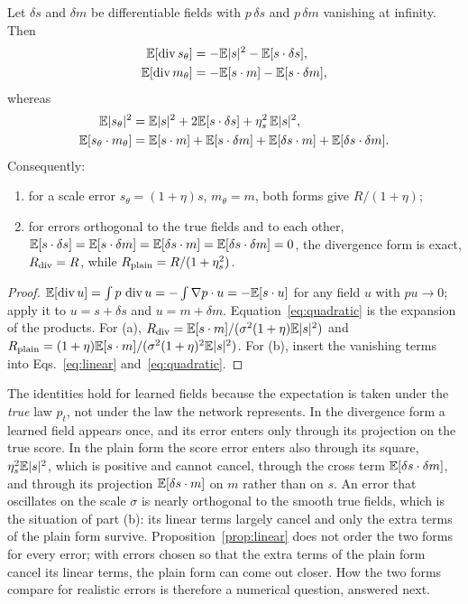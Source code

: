 \begin{proposition}
\label{prop:linear}
Let $\delta s$ and $\delta m$ be differentiable fields with $p\,\delta s$ and $p\,\delta m$ vanishing at infinity. Then
\begin{align}
\mathbb{E}[\operatorname{div} s_\theta] &= -\mathbb{E}|s|^2 - \mathbb{E}[s\cdot\delta s], \nonumber\\
\mathbb{E}[\operatorname{div} m_\theta] &= -\mathbb{E}[s\cdot m] - \mathbb{E}[s\cdot\delta m],
\label{eq:linear}
\end{align}
whereas
\begin{align}
\mathbb{E}|s_\theta|^2 &= \mathbb{E}|s|^2 + 2\mathbb{E}[s\cdot\delta s] + \eta_s^2\,\mathbb{E}|s|^2, \nonumber\\
\mathbb{E}[s_\theta\cdot m_\theta] &= \mathbb{E}[s\cdot m] + \mathbb{E}[s\cdot\delta m] + \mathbb{E}[\delta s\cdot m] + \mathbb{E}[\delta s\cdot\delta m].
\label{eq:quadratic}
\end{align}
Consequently:
\begin{enumerate}
\item[(a)] for a scale error $s_\theta = (1+\eta)s$, $m_\theta = m$, both forms give $R/(1+\eta)$;
\item[(b)] for errors orthogonal to the true fields and to each other, $\mathbb{E}[s\cdot\delta s] = \mathbb{E}[s\cdot\delta m] = \mathbb{E}[\delta s\cdot m] = \mathbb{E}[\delta s\cdot\delta m] = 0$, the divergence form is exact, $R_{\rm div} = R$, while $R_{\rm plain} = R/(1+\eta_s^2)$.
\end{enumerate}
\end{proposition}
\begin{proof}
$\mathbb{E}[\operatorname{div} u] = \int p\,\operatorname{div} u = -\int \nabla p\cdot u = -\mathbb{E}[s\cdot u]$ for any field $u$ with $p u \to 0$; apply it to $u = s + \delta s$ and $u = m + \delta m$. Equation~\eqref{eq:quadratic} is the expansion of the products. For (a), $R_{\rm div} = \mathbb{E}[s\cdot m]/(\sigma^2(1+\eta)\mathbb{E}|s|^2)$ and $R_{\rm plain} = (1+\eta)\mathbb{E}[s\cdot m]/(\sigma^2(1+\eta)^2\mathbb{E}|s|^2)$. For (b), insert the vanishing terms into Eqs.~\eqref{eq:linear} and~\eqref{eq:quadratic}.
\end{proof}

The identities hold for learned fields because the expectation is taken under the \emph{true} law $p_t$, not under the law the network represents. In the divergence form a learned field appears once, and its error enters only through its projection on the true score. In the plain form the score error enters also through its square, $\eta_s^2\mathbb{E}|s|^2$, which is positive and cannot cancel, through the cross term $\mathbb{E}[\delta s\cdot\delta m]$, and through its projection $\mathbb{E}[\delta s\cdot m]$ on $m$ rather than on $s$. An error that oscillates on the scale $\sigma$ is nearly orthogonal to the smooth true fields, which is the situation of part (b): its linear terms largely cancel and only the extra terms of the plain form survive. Proposition~\ref{prop:linear} does not order the two forms for every error; with errors chosen so that the extra terms of the plain form cancel its linear terms, the plain form can come out closer. How the two forms compare for realistic errors is therefore a numerical question, answered next.

